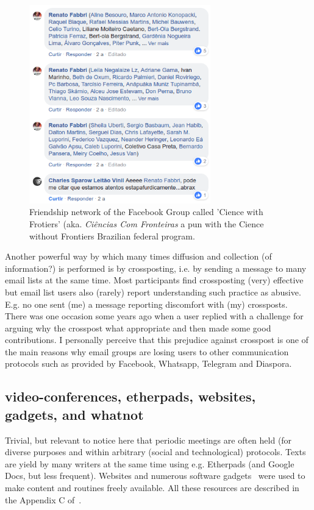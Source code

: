 \documentclass[a4paper]{article}
\begin{document}
\begin{figure}
  \centering
    \includegraphics[width=0.7\textwidth]{Screenshot}
  \caption{Friendship network of the Facebook Group called 'Cience with Frotiers' (aka. \emph{Ciências Com Fronteiras} a pun with the Cience without Frontiers Brazilian federal program.}
\end{figure}


Another powerful way by which many times diffusion and collection (of information?) is performed
is by crossposting, i.e. by sending a message to many email lists
at the same time.
Most participants find crossposting (very) effective but email list users also (rarely) report understanding such practice as abusive.
E.g. no one sent (me) a message reporting discomfort with (my) crossposts.
There was one occasion some years ago when a user replied with a challenge for
arguing why the crosspost what appropriate and then made some good contributions.
I personally perceive that this prejudice against crosspost is one of the main reasons
why email groups are losing users to other communication protocols such as provided by
Facebook, Whatsapp, Telegram and Diaspora.

\subsection{video-conferences, etherpads, websites, gadgets, and whatnot}\label{video}
Trivial, but relevant to notice here that periodic meetings are often held
(for diverse purposes and within arbitrary (social and technological) protocols.
Texts are yield by many writers at the same time using e.g. Etherpads (and Google Docs, but less frequent).
Websites and numerous software gadgets~\cite{ttmRepos} were used to make content and routines
freely available. All these resources are described in the Appendix C of~\cite{thesis}.
      
\end{document}
